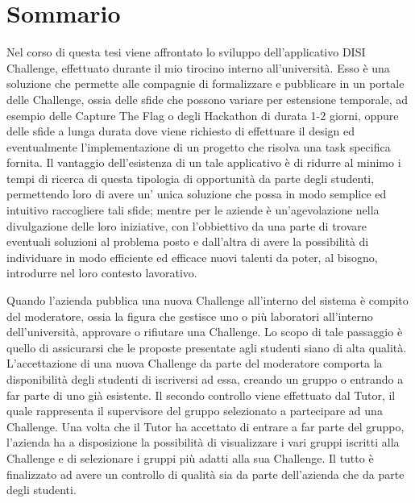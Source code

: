 \chapter*{Sommario} %
\label{sommario}






Nel corso di questa tesi viene affrontato lo sviluppo dell'applicativo DISI Challenge, effettuato durante il mio tirocino interno all'università. Esso è una soluzione che permette alle compagnie di formalizzare e pubblicare in un portale delle Challenge, ossia delle sfide che possono variare per estensione temporale, ad esempio delle Capture The Flag o degli Hackathon di durata 1-2 giorni, oppure delle sfide a lunga durata dove viene richiesto di effettuare il design ed eventualmente l'implementazione di un progetto che risolva una task specifica fornita. Il vantaggio dell'esistenza di un tale applicativo è di ridurre al minimo i tempi di ricerca di questa tipologia di opportunità da parte degli studenti, permettendo loro di avere un' unica soluzione che possa in modo semplice ed intuitivo raccogliere tali sfide; mentre per le aziende è un'agevolazione nella divulgazione delle loro iniziative, con l'obbiettivo da una parte di trovare eventuali soluzioni al problema posto e dall'altra di avere la possibilità di individuare in modo efficiente ed efficace nuovi talenti da poter, al bisogno, introdurre nel loro contesto lavorativo.

Quando l'azienda pubblica una nuova Challenge all'interno del sistema è compito del moderatore, ossia la figura che gestisce uno o più laboratori all'interno dell'università, approvare o rifiutare una Challenge. Lo scopo di tale passaggio è quello di assicurarsi che le proposte presentate agli studenti siano di alta qualità. L'accettazione di una nuova Challenge da parte del moderatore comporta la disponibilità degli studenti di iscriversi ad essa, creando un gruppo o entrando a far parte di uno già esistente. Il secondo controllo viene effettuato dal Tutor, il quale rappresenta il supervisore del gruppo selezionato a partecipare ad una Challenge. Una volta che il Tutor ha accettato di entrare a far parte del gruppo, l'azienda ha a disposizione la possibilità di visualizzare i vari gruppi iscritti alla Challenge e di selezionare i gruppi più adatti alla sua Challenge. Il tutto è finalizzato ad avere un controllo di qualità sia da parte dell'azienda che da parte degli studenti. 



